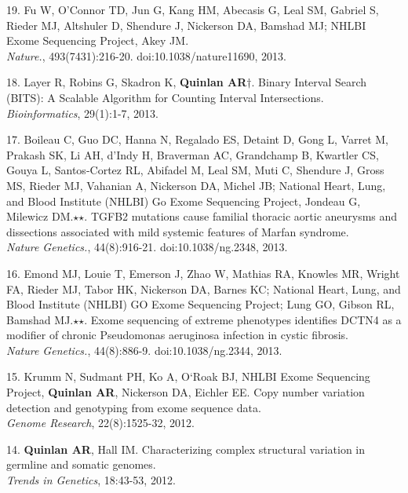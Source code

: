 \documentclass[margin,line]{cv}
\begin{document}
\begin{resume}
\begin{list}{*}{}
    \item[19.] Fu W, O'Connor TD, Jun G, Kang HM, Abecasis G, Leal SM, Gabriel S, Rieder MJ, Altshuler D, Shendure J, Nickerson DA, Bamshad MJ; NHLBI Exome Sequencing Project, Akey JM.\\
    \emph{Nature.}, 493(7431):216-20. doi:10.1038/nature11690, 2013.
	
    \item[18.] Layer R, Robins G, Skadron K, \textbf{Quinlan AR}$\dagger$. 
    Binary Interval Search (BITS): A Scalable Algorithm for Counting Interval Intersections.\\
    \emph{Bioinformatics}, 29(1):1-7, 2013.
	
    \item[17.] Boileau C, Guo DC, Hanna N, Regalado ES, Detaint D, Gong L, Varret M, Prakash SK, Li AH, d'Indy H, Braverman AC, Grandchamp B, Kwartler CS, Gouya L, Santos-Cortez RL, Abifadel M, Leal SM, Muti C, Shendure J, Gross MS, Rieder MJ, Vahanian A, Nickerson DA, Michel JB; National Heart, Lung, and Blood Institute (NHLBI) Go Exome Sequencing Project, Jondeau G, Milewicz DM.$\star$$\star$. TGFB2 mutations cause familial thoracic aortic aneurysms and dissections associated with mild systemic features of Marfan syndrome.\\
    \emph{Nature Genetics.}, 44(8):916-21. doi:10.1038/ng.2348, 2013.

    \item[16.] Emond MJ, Louie T, Emerson J, Zhao W, Mathias RA, Knowles MR, Wright FA, Rieder MJ, Tabor HK, Nickerson DA, Barnes KC; National Heart, Lung, and Blood Institute (NHLBI) GO Exome Sequencing Project; Lung GO, Gibson RL, Bamshad MJ.$\star$$\star$. Exome sequencing of extreme phenotypes identifies DCTN4 as a modifier of chronic Pseudomonas aeruginosa infection in cystic fibrosis.\\
    \emph{Nature Genetics.}, 44(8):886-9. doi:10.1038/ng.2344, 2013.

    \item[15.] Krumm N, Sudmant PH, Ko A, O`Roak BJ, NHLBI Exome Sequencing Project, 
    \textbf{Quinlan AR}, Nickerson DA, Eichler EE. 
    Copy number variation detection and genotyping from exome sequence data.\\
    \textit{Genome Research}, 22(8):1525-32, 2012.

    \item[14.] \textbf{Quinlan AR}, Hall IM. 
    Characterizing complex structural variation in germline and somatic genomes.\\
    \textit{Trends in Genetics}, 18:43-53, 2012.


\end{list}
\end{resume}
\end{document}
